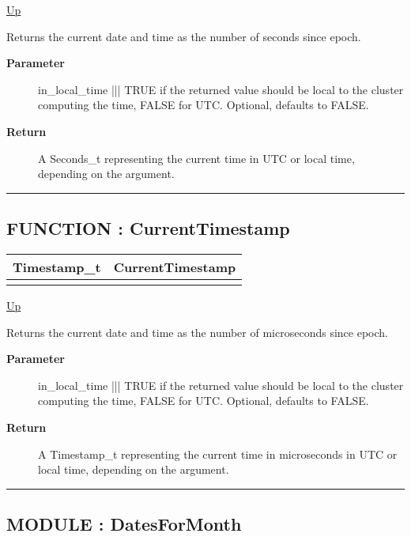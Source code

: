 \hyperlink{ecldoc:Date}{Up}

\par
Returns the current date and time as the number of seconds since epoch.

\par
\begin{description}
\item [\textbf{Parameter}] in\_local\_time ||| TRUE if the returned value should be local to the cluster computing the time, FALSE for UTC. Optional, defaults to FALSE.
\item [\textbf{Return}] A Seconds\_t representing the current time in UTC or local time, depending on the argument.
\end{description}

\rule{\textwidth}{0.4pt}
\subsection*{FUNCTION : CurrentTimestamp}
\hypertarget{ecldoc:date.currenttimestamp}{}

{\renewcommand{\arraystretch}{1.5}
\begin{tabularx}{\textwidth}{|>{\raggedright\arraybackslash}l|X|}
\hline
\hspace{0pt}Timestamp\_t & CurrentTimestamp \\
\hline
\multicolumn{2}{|>{\raggedright\arraybackslash}X|}{\hspace{0pt}(BOOLEAN in\_local\_time = FALSE)} \\
\hline
\end{tabularx}
}

\hyperlink{ecldoc:Date}{Up}

\par
Returns the current date and time as the number of microseconds since epoch.

\par
\begin{description}
\item [\textbf{Parameter}] in\_local\_time ||| TRUE if the returned value should be local to the cluster computing the time, FALSE for UTC. Optional, defaults to FALSE.
\item [\textbf{Return}] A Timestamp\_t representing the current time in microseconds in UTC or local time, depending on the argument.
\end{description}

\rule{\textwidth}{0.4pt}
\subsection*{MODULE : DatesForMonth}
\hypertarget{ecldoc:date.datesformonth}{}

